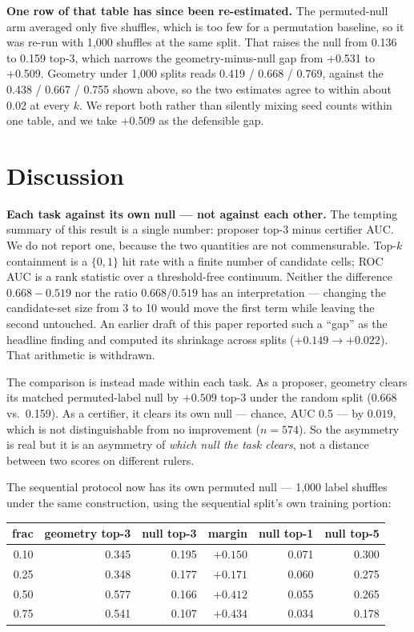 \documentclass[11pt]{article}
\begin{document}
\textbf{One row of that table has since been re-estimated.} The
permuted-null arm averaged only five shuffles, which is too few for a
permutation baseline, so it was re-run with 1{,}000 shuffles at the same
split. That raises the null from 0.136 to 0.159 top-3, which narrows the
geometry-minus-null gap from +0.531 to +0.509. Geometry under 1{,}000
splits reads 0.419 / 0.668 / 0.769, against the 0.438 / 0.667 / 0.755
shown above, so the two estimates agree to within about 0.02 at every $k$.
We report both rather than silently mixing seed counts within one table,
and we take +0.509 as the defensible gap.

\section{Discussion}

\textbf{Each task against its own null --- not against each other.} The
tempting summary of this result is a single number: proposer top-3 minus
certifier AUC. We do not report one, because the two quantities are not
commensurable. Top-$k$ containment is a $\{0,1\}$ hit rate with a finite
number of candidate cells; ROC AUC is a rank statistic over a threshold-free
continuum. Neither the difference $0.668-0.519$ nor the ratio
$0.668/0.519$ has an interpretation --- changing the candidate-set size from
3 to 10 would move the first term while leaving the second untouched. An
earlier draft of this paper reported such a ``gap'' as the headline finding
and computed its shrinkage across splits ($+0.149 \to +0.022$). That
arithmetic is withdrawn.

The comparison is instead made within each task. As a proposer, geometry
clears its matched permuted-label null by $+0.509$ top-3 under the random
split (0.668 vs.\ 0.159). As a certifier, it clears its own null --- chance,
AUC 0.5 --- by $0.019$, which is not distinguishable from no improvement
($n = 574$). So the asymmetry is real but it is an asymmetry of \emph{which
null the task clears}, not a distance between two scores on different
rulers.

The sequential protocol now has its own permuted null --- 1{,}000 label
shuffles under the same construction, using the sequential split's own
training portion:

\begin{center}
\begin{tabular}{rrrrrr}
\toprule
\textbf{frac} & \textbf{geometry top-3} & \textbf{null top-3} & \textbf{margin} & \textbf{null top-1} & \textbf{null top-5} \\
\midrule
0.10 & 0.345 & 0.195 & $+0.150$ & 0.071 & 0.300 \\
0.25 & 0.348 & 0.177 & $+0.171$ & 0.060 & 0.275 \\
0.50 & 0.577 & 0.166 & $+0.412$ & 0.055 & 0.265 \\
0.75 & 0.541 & 0.107 & $+0.434$ & 0.034 & 0.178 \\
\bottomrule
\end{tabular}
\end{center}
\end{document}
